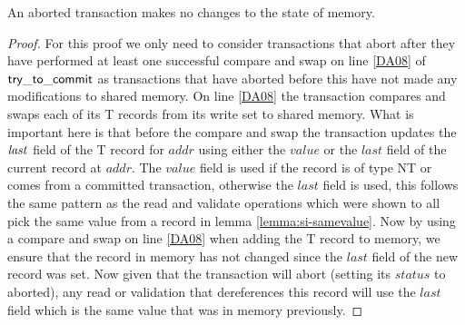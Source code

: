 \begin{lemma}
\label{lemma:si-abort}
An aborted transaction makes no changes to the state of memory.
\end{lemma}
\begin{proof}
For this proof we only need to consider transactions that abort after they have performed
at least one successful compare and swap on line \ref{DA08} of $\sf{try\_to\_commit}$ as transactions
that have aborted before this have not made any modifications to shared memory.
On line \ref{DA08} the transaction compares and swaps each of its T records from its write set to
shared memory.
What is important here is that before the compare and swap the transaction updates the $\ms{last}$
field of the T record for $\mathit{addr}$ using either the $\mathit{value}$ or the $\mathit{last}$ field of the current
record at $\mathit{addr}$.
The $\mathit{value}$ field is used if the record is of type NT or comes from a committed transaction, otherwise the $\mathit{last}$
field is used, this follows the same pattern as the read and validate operations which were shown to all pick the same value
from a record in lemma \ref{lemma:si-samevalue}.
Now by using a compare and swap on line \ref{DA08} when adding the T record to memory, we ensure that the record in memory has not
changed since the $\mathit{last}$ field of the new record was set.
Now given that the transaction will abort (setting its $\mathit{status}$ to aborted), any read or validation that dereferences
this record will use the $\mathit{last}$ field which is the same value that was in memory previously.
\end{proof}



